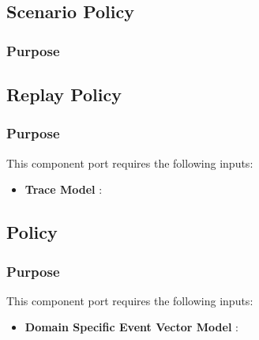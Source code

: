 \documentclass{gemoc} %
\begin{document}


\subsection{Scenario Policy}


\subsubsection{Purpose}



\subsection{Replay Policy}


\subsubsection{Purpose}

This component port requires the following inputs:
\begin{itemize}
  \item \textbf{Trace Model} :
\end{itemize}


\subsection{Policy}


\subsubsection{Purpose}

This component port requires the following inputs:
\begin{itemize}
  \item \textbf{Domain Specific Event Vector Model} :
\end{itemize}
\end{document}
